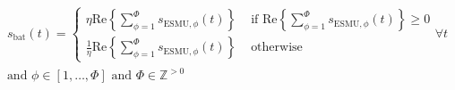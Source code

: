 \begin{equation}
\begin{split}
	s_\text{bat}(t) = 
	\begin{cases}
		\eta\text{Re}\left\{\sum_{\phi=1}^{\Phi}s_{\text{ESMU},\phi}(t)\right\} &\text{ if } \text{Re}\left\{\sum_{\phi=1}^{\Phi}s_{\text{ESMU},\phi}(t)\right\} \geq 0\\
		\frac{1}{\eta}\text{Re}\left\{\sum_{\phi=1}^{\Phi}s_{\text{ESMU},\phi}(t)\right\} &\text{ otherwise}
	\end{cases} \forall t \\
	\text{and } \phi \in [1, \dots, \Phi] \text{ and } \Phi \in \mathbb{Z}^{>0}
\end{split}
\label{ch1:equ:battery-power-definition}
\end{equation}